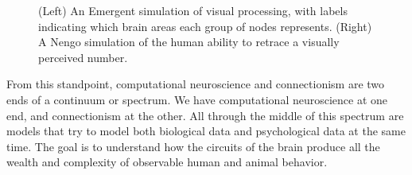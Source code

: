 \begin{figure}[h]
\centering
{}
\hspace*{.4in}
\caption[Left: From \url{https://grey.colorado.edu/emergent/index.php/File:Screenshot_vision.png}; Right: Spaun screenshot. Cf. \cite{eliasmith2012large}.]{(Left) An Emergent simulation of visual processing, with labels indicating which brain areas each group of nodes represents. (Right) A Nengo simulation of the human ability to retrace a visually perceived number.}
\label{ccn}
\end{figure}

 From this standpoint, computational neuroscience and connectionism are two ends of a continuum or spectrum. We have computational neuroscience at one end, and connectionism at the other. All through the middle of this spectrum are models that try to model both biological data and psychological data at the same time. The goal is to understand how the circuits of the brain produce all the wealth and complexity of observable human and animal behavior. 

